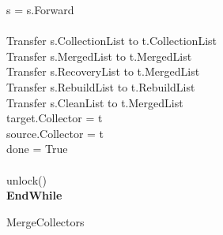 \begin{algorithm}[ht]
{{\quad \quad s = s.Forward \\
\\
\quad \quad Transfer s.CollectionList to t.CollectionList \\
\quad \quad Transfer s.MergedList to t.MergedList \\
\quad \quad Transfer s.RecoveryList to t.MergedList \\
\quad \quad Transfer s.RebuildList to t.RebuildList \\
\quad \quad Transfer s.CleanList to t.MergedList \\
\quad \quad target.Collector = t\\
\quad \quad source.Collector = t\\
\quad \quad done = True\\
\\
\quad unlock()\\
{\bf EndWhile} \\
}
}
\caption{MergeCollectors}
\label{algorithm:mergecollectors}
\end{algorithm}
